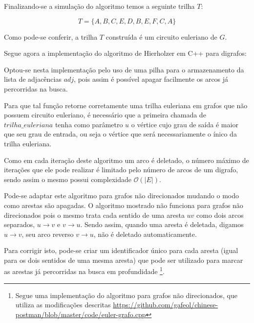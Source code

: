 Finalizando-se a simulação do algoritmo temos a seguinte trilha $T$:

\[
    T = \{A, B, C, E, D, B, E, F, C, A\}
\]

Como pode-se conferir, a trilha $T$ construída é um circuito euleriano de $G$.


Segue agora a implementação do algoritmo de Hierholzer em C++ para digrafos:



Optou-se nesta implementação pelo uso de uma pilha para o armazenamento da lista de adjacências $adj$, pois assim é possível apagar facilmente os arcos já percorridas na busca.


Para que tal função retorne corretamente uma trilha euleriana em grafos que não possuem circuito euleriano, é necessário que a primeira chamada de $trilha\_euleriana$ tenha como parâmetro $u$ o vértice cujo grau de saída é maior que seu grau de entrada, ou seja o vértice que será necessariamente o ínico da trilha euleriana.

Como em cada iteração deste algoritmo um arco é deletado, o número máximo de iterações que ele pode realizar é limitado pelo número de arcos de um digrafo, sendo assim o mesmo possui complexidade $\mathcal{O}(|E|)$.

Pode-se adaptar este algoritmo para grafos não direcionados mudando o modo como arestas são apagadas.
O algoritmo mostrado não funciona para grafos não direcionados pois o mesmo trata cada sentido de uma aresta $uv$ como dois arcos separados, $u \rightarrow v$ e $v \rightarrow u$. 
Sendo assim, quando uma aresta é deletada, digamos $u \rightarrow v$, seu arco reverso $v \rightarrow u$, não é deletado automaticamente.

Para corrigir isto, pode-se criar um identificador único para cada aresta (igual para os dois sentidos de uma mesma aresta) que pode ser utilizado para marcar as arestas já percorridas na busca em profundidade \footnote{Segue uma implementação do algoritmo para grafos não direcionados, que utiliza as modificações descritas \href{https://github.com/gafeol/chinese-postman/blob/master/code/euler-grafo.cpp}{https://github.com\-/gafeol\-/chinese-postman\-/blob/master\-/code/euler-grafo.cpp}}. 

